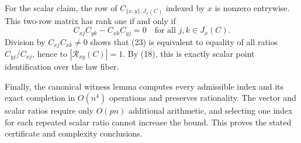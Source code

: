 For the scalar claim, the row of \(C_{\{x,y\},J_x(C)}\) indexed by \(x\) is nonzero entrywise. This two-row matrix has rank one if and only if
\[
 C_{xj}C_{yk}-C_{xk}C_{yj}=0
 \quad\text{for all }j,k\in J_x(C). \tag{23}
\]
Division by \(C_{xj}C_{xk}\ne0\) shows that (23) is equivalent to equality of all ratios \(C_{yj}/C_{xj}\), hence to \(|\mathcal R_{xy}(C)|=1\). By (18), this is exactly scalar point identification over the law fiber.

Finally, the canonical witness lemma computes every admissible index and its exact completion in \(O(n^4)\) operations and preserves rationality. The vector and scalar ratios require only \(O(pn)\) additional arithmetic, and selecting one index for each repeated scalar ratio cannot increase the bound. This proves the stated certificate and complexity conclusions.